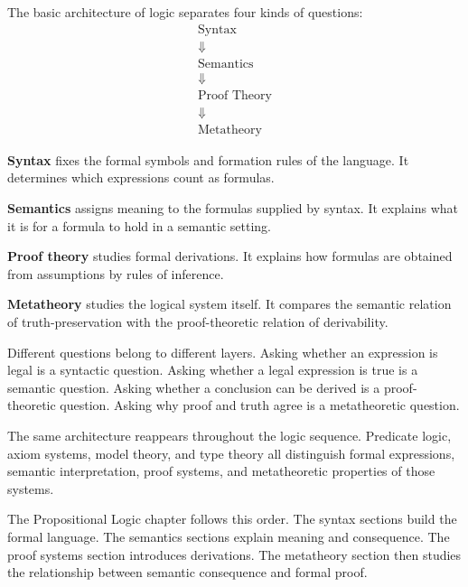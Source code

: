 \begin{tcolorbox}[colback=structurebox, colframe=structureborder, arc=2pt,
  left=8pt, right=8pt, top=6pt, bottom=6pt,
  title={\small\textbf{Architecture Presentation: The Four Layers of Logic}},
  fonttitle=\small\bfseries]
The basic architecture of logic separates four kinds of questions:
\[
\begin{array}{c}
\text{Syntax}\\
\Downarrow\\
\text{Semantics}\\
\Downarrow\\
\text{Proof Theory}\\
\Downarrow\\
\text{Metatheory}
\end{array}
\]

\textbf{Syntax} fixes the formal symbols and formation rules of the language.
It determines which expressions count as formulas.

\textbf{Semantics} assigns meaning to the formulas supplied by syntax. It
explains what it is for a formula to hold in a semantic setting.

\textbf{Proof theory} studies formal derivations. It explains how formulas
are obtained from assumptions by rules of inference.

\textbf{Metatheory} studies the logical system itself. It compares the
semantic relation of truth-preservation with the proof-theoretic relation of
derivability.
\end{tcolorbox}

\begin{remark*}
Different questions belong to different layers. Asking whether an expression
is legal is a syntactic question. Asking whether a legal expression is true is
a semantic question. Asking whether a conclusion can be derived is a
proof-theoretic question. Asking why proof and truth agree is a metatheoretic
question.
\end{remark*}

\begin{remark*}
The same architecture reappears throughout the logic sequence. Predicate
logic, axiom systems, model theory, and type theory all distinguish formal
expressions, semantic interpretation, proof systems, and metatheoretic
properties of those systems.
\end{remark*}

\begin{remark*}
The Propositional Logic chapter follows this order. The syntax sections build
the formal language. The semantics sections explain meaning and consequence.
The proof systems section introduces derivations. The metatheory section then
studies the relationship between semantic consequence and formal proof.
\end{remark*}

